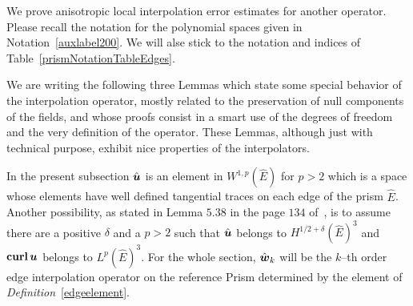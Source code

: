 We prove anisotropic local interpolation error estimates for another operator. 
Please recall 
the notation for the polynomial spaces given in Notation~\ref{auxlabel200}. We 
will alse stick to the notation and indices of Table~\ref{prismNotationTableEdges}.

We are writing the following three Lemmas which state some special
behavior of the interpolation operator, mostly related to the preservation of
null components of the fields, and whose proofs consist in a smart use of the
degrees of freedom and the very definition of the operator. These Lemmas, 
although just with technical purpose, exhibit
nice properties of the interpolators.

In the present subsection $\hat{\boldsymbol{u}}$ is an element
in $W^{1,p}(\hat{E})$ for $p>2$ which is a space whose elements have well
defined tangential traces on each edge of the prism $\hat{E}$.
Another possibility, as stated in Lemma $5.38$ in the page $134$ of~\cite{monk},
is to assume there are 
a positive $\delta$ and a $p>2$ such that 
$\hat{\boldsymbol{u}}$ belongs to $H^{1/2+\delta}(\hat{E})^3$ and
${\bf curl}\,\boldsymbol{u}$ belongs to $L^p(\hat{E})^3$.
For the whole section, $\hat{\boldsymbol{w}}_k$ will be the $k$--th order edge 
interpolation operator on the reference
Prism determined by the element of
\emph{Definition}~\ref{edgeelement}.

